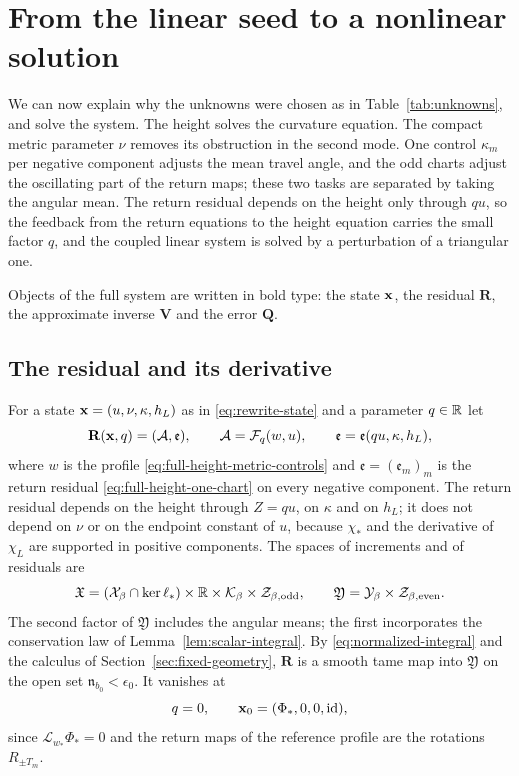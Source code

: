 \section{From the linear seed to a nonlinear solution}
\label{sec:solving-the-equation}
\label{sec:exact-return-height}

We can now explain why the unknowns were chosen as in
Table~\ref{tab:unknowns}, and solve the system. The height solves the
curvature equation. The compact metric parameter $\nu$ removes its
obstruction in the second mode. One control $\kappa_m$ per negative
component adjusts the mean travel angle, and the odd charts adjust the
oscillating part of the return maps; these two tasks are separated by
taking the angular mean. The return residual depends on the height
only through $qu$, so the feedback from the return equations to the
height equation carries the small factor $q$, and the coupled linear
system is solved by a perturbation of a triangular one.

Objects of the full system are written in bold type: the state $\mathbf x$,
the residual $\mathbf R$, the approximate inverse $\mathbf V$ and the
error $\mathbf Q$.

\subsection{The residual and its derivative}

For a state $\mathbf x=(u,\nu,\kappa,h_L)$ as in
\eqref{eq:rewrite-state} and a parameter $q\in\mathbb R$ let
\begin{equation}\label{eq:readable-joint-residual}
 \mathbf R(\mathbf x,q)=(\mathcal A,\mathfrak e),
 \qquad \mathcal A=\mathcal F_q(w,u),
 \qquad \mathfrak e=\mathfrak e(qu,\kappa,h_L),
\end{equation}
where $w$ is the profile \eqref{eq:full-height-metric-controls} and
$\mathfrak e=(\mathfrak e_m)_m$ is the return residual
\eqref{eq:full-height-one-chart} on every negative component. The
return residual depends on the height through $Z=qu$, on $\kappa$ and
on $h_L$; it does not depend on $\nu$ or on the endpoint constant of
$u$, because $\chi_*$ and the derivative of $\chi_L$ are supported in
positive components. The spaces of increments and of residuals are
\[
 \mathfrak X=(\mathcal X_\beta\cap\ker\ell_*)\times\mathbb R
       \times\mathcal K_\beta\times\mathcal Z_{\beta,\mathrm{odd}},
 \qquad
 \mathfrak Y=\mathcal Y_\beta\times\mathcal Z_{\beta,\mathrm{even}} .
\]
The second factor of $\mathfrak Y$ includes the angular means; the
first incorporates the conservation law of
Lemma~\ref{lem:scalar-integral}. By \eqref{eq:normalized-integral}
and the calculus of Section~\ref{sec:fixed-geometry}, $\mathbf R$ is a
smooth tame map into $\mathfrak Y$ on the open set
$\mathfrak n_{b_0}<\epsilon_0$. It vanishes at
\[
 q=0,\qquad \mathbf x_0=(\Phi_*,0,0,\mathrm{id}),
\]
since $\mathscr L_{w_*}\Phi_*=0$ and the return maps of the reference
profile are the rotations $R_{\pm T_m}$.

